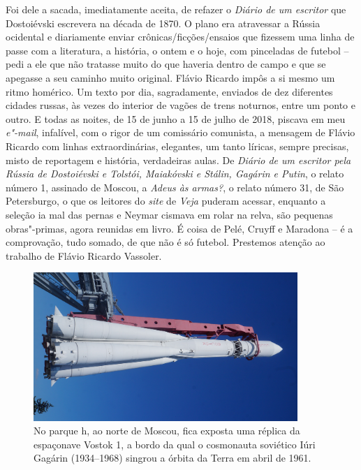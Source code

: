 Foi dele a sacada, imediatamente aceita, de refazer o \emph{Diário de um
escritor} que Dostoiévski escrevera na década de 1870. O plano era
atravessar a Rússia ocidental e diariamente enviar
crônicas/ficções/ensaios que fizessem uma linha de passe com a
literatura, a história, o ontem e o hoje, com pinceladas de futebol --
pedi a ele que não tratasse muito do que haveria dentro de campo e que
se apegasse a seu caminho muito original. Flávio Ricardo impôs a si
mesmo um ritmo homérico. Um texto por dia, sagradamente, enviados de dez
diferentes cidades russas, às vezes do interior de vagões de trens
noturnos, entre um ponto e outro. E todas as noites, de 15 de junho a 15
de julho de 2018, piscava em meu \emph{e"-mail}, infalível, com o rigor
de um comissário comunista, a mensagem de Flávio Ricardo com linhas
extraordinárias, elegantes, um tanto líricas, sempre precisas, misto de
reportagem e história, verdadeiras aulas. De \emph{Diário de um escritor
pela Rússia de Dostoiévski e Tolstói, Maiakóvski e Stálin, Gagárin e
Putin}, o relato número 1, assinado de Moscou, a \emph{Adeus às armas?},
o relato número 31, de São Petersburgo, o que os leitores do \emph{site}
de \emph{Veja} puderam acessar, enquanto a seleção ia mal das pernas e
Neymar cismava em rolar na relva, são pequenas obras"-primas, agora
reunidas em livro. É coisa de Pelé, Cruyff e Maradona -- é a
comprovação, tudo somado, de que não é só futebol. Prestemos atenção ao
trabalho de Flávio Ricardo Vassoler.

\pagebreak
\clearpage
\thispagestyle{empty}

\movetoevenpage
\begin{absolutelynopagebreak}
\begin{vplace}
\begin{figure}[H]
\begin{adjustwidth}{-2.7cm}{}
  \vspace{-2.3cm}
  \hspace{2.3cm}
  \includegraphics[width=100mm]{./imgs/moscou1.jpg}  
\end{adjustwidth}
  \caption{No parque h, ao norte de Moscou, fica exposta uma réplica da espaçonave Vostok 1, a bordo da qual o cosmonauta soviético Iúri Gagárin (1934--1968) singrou a órbita da Terra em abril de 1961.}

\thispagestyle{empty}

\end{figure}
\end{vplace}

\end{absolutelynopagebreak}

